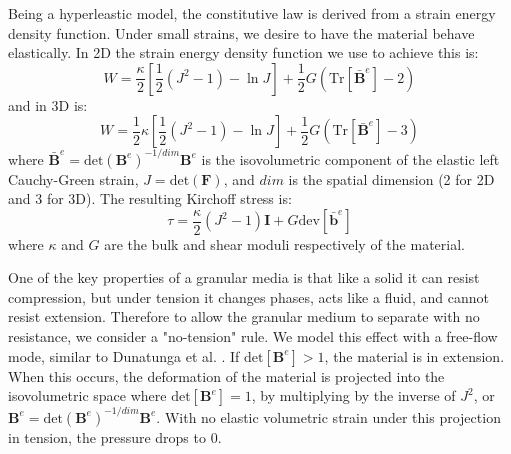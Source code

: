Being a hyperleastic model, the constitutive law is derived from a strain energy density function.
Under small strains, we desire to have the material behave elastically. In 2D the strain energy density function we use to achieve this is:
\begin{equation}
W = \frac{\kappa}{2} \left[ \frac{1}{2} ( J^2 - 1 ) - \ln J \right] + \frac{1}{2} G ( \text{Tr}[ \bar{\bm{B}}^e ] - 2 )
\end{equation}
and in 3D is:
\begin{equation}
W = \frac{1}{2} \kappa \left[ \frac{1}{2} ( J^2 - 1 ) - \ln J \right] + \frac{1}{2} G ( \text{Tr}[ \bar{\bm{B}}^e ] - 3 )
\end{equation}
where $\bar{\bm{B}}^e = \text{det}\left( \bm{B}^e \right)^{-1/{dim}} \bm{B}^e$ is the isovolumetric component of the elastic left Cauchy-Green strain, $J = \text{det}\left( \bm{F} \right)$, and $dim$ is the spatial dimension (2 for 2D and 3 for 3D). The resulting Kirchoff stress is:
\begin{equation}
\tau = \frac{\kappa}{2} \left( J^2 - 1 \right)\bm{I} + G \text{dev}[\bar{\bm{b}}^e] \label{kirchoff_stress_hyper}
\end{equation}
where $\kappa$ and $G$ are the bulk and shear moduli respectively of the material.

One of the key properties of a granular media is that like a solid it can resist compression, but under tension it changes phases, acts like a fluid, and cannot resist extension. Therefore to allow the granular medium to separate with no resistance, we consider a "no-tension" rule. We model this effect with a free-flow mode, similar to Dunatunga et al. \cite{Dunatunga:2015:Continuum}. If $\text{det}[\bm{B}^e]>1$, the material is in extension. When this occurs, the deformation of the material is projected into the isovolumetric space where $\text{det}[\bm{B}^e]=1$, by multiplying by the inverse of $J^2$, or $\bm{B}^e=\text{det}\left( \bm{B}^e \right)^{-1/{dim}} \bm{B}^e$. With no elastic volumetric strain under this projection in tension, the pressure drops to 0.

